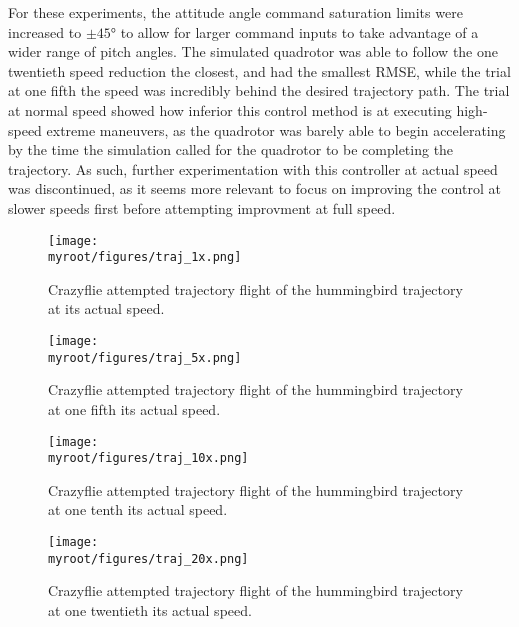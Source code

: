 For these experiments, the attitude angle command saturation limits were increased to $\pm\ang{45}$ to allow for larger command inputs to take advantage of a wider range of pitch angles. The simulated quadrotor was able to follow the one twentieth speed reduction the closest, and had the smallest RMSE, while the trial at one fifth the speed was incredibly behind the desired trajectory path. The trial at normal speed showed how inferior this control method is at executing high-speed extreme maneuvers, as the quadrotor was barely able to begin accelerating by the time the simulation called for the quadrotor to be completing the trajectory. As such, further experimentation with this controller at actual speed was discontinued, as it seems more relevant to focus on improving the control at slower speeds first before attempting improvment at full speed.

\clearpage
\begin{figure}[p]
\begin{center}
\texttt{[image: \\myroot/figures/traj\_1x.png]}
\end{center}
\caption{Crazyflie attempted trajectory flight of the hummingbird trajectory at its actual speed.}
\label{fig:actualspeed}
\end{figure}

\begin{figure}[p]
\begin{center}
\texttt{[image: \\myroot/figures/traj\_5x.png]}
\end{center}
\caption{Crazyflie attempted trajectory flight of the hummingbird trajectory at one fifth its actual speed.}
\label{fig:onefifthspeed}
\end{figure}

\clearpage
\begin{figure}[p]
\begin{center}
\texttt{[image: \\myroot/figures/traj\_10x.png]}
\end{center}
\caption{Crazyflie attempted trajectory flight of the hummingbird trajectory at one tenth its actual speed.}
\label{fig:onetenthspeed}
\end{figure}

\begin{figure}[p]
\begin{center}
\texttt{[image: \\myroot/figures/traj\_20x.png]}
\end{center}
\caption{Crazyflie attempted trajectory flight of the hummingbird trajectory at one twentieth its actual speed.}
\label{fig:onetwentiethspeed}
\end{figure}








